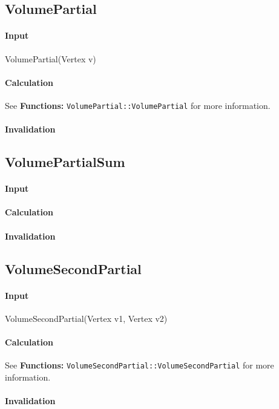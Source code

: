 \subsection{VolumePartial}

\paragraph{Input}

VolumePartial(Vertex v)

\paragraph{Calculation}

See \textbf{Functions: }\texttt{VolumePartial::VolumePartial} for more
information.

\paragraph{Invalidation}

\bigskip

\subsection{VolumePartialSum}

\paragraph{Input}

\paragraph{Calculation}

\paragraph{Invalidation}

\bigskip

\subsection{VolumeSecondPartial}

\paragraph{Input}

VolumeSecondPartial(Vertex v1, Vertex v2)

\paragraph{Calculation}

See \textbf{Functions: }\texttt{VolumeSecondPartial::VolumeSecondPartial}
for more information.

\paragraph{Invalidation}

\bigskip
